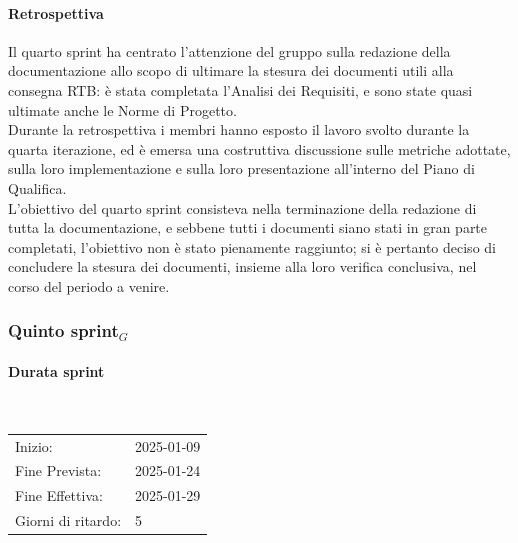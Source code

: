 \documentclass[10pt]{article}
\begin{document}
{{{{{    \paragraph{Retrospettiva}\mbox{}\vspace{0.4em}

    Il quarto sprint ha centrato l'attenzione del gruppo sulla redazione della documentazione allo scopo di ultimare la stesura dei 
    documenti utili alla consegna RTB: è stata completata l'Analisi dei Requisiti, e sono state quasi ultimate anche le Norme di Progetto.\\
    Durante la retrospettiva i membri hanno esposto il lavoro svolto durante la quarta iterazione, ed è emersa una costruttiva discussione
    sulle metriche adottate, sulla loro implementazione e sulla loro presentazione all'interno del Piano di Qualifica.\\
    L'obiettivo del quarto sprint consisteva nella terminazione della redazione di tutta la documentazione, e sebbene tutti i documenti siano
    stati in gran parte completati, l'obiettivo non è stato pienamente raggiunto; si è pertanto deciso di concludere la stesura dei documenti,
    insieme alla loro verifica conclusiva, nel corso del periodo a venire.



\newpage
\subsubsection{Quinto sprint$_G$}
\label{quinto-sprint$_G$}
    
    \paragraph{Durata sprint}\mbox{}\\
    \vspace{-1.5em}
    \begin{table}[h] 
    \renewcommand{\arraystretch}{1.2}  
    \begin{tabular}{ l l }
        Inizio: & 2025-01-09 \\
        Fine Prevista: & 2025-01-24 \\
        Fine Effettiva: & 2025-01-29 \\
        Giorni di ritardo: & 5 \\
    \end{tabular}
    \end{table}
    \vspace{-2em}
    {\renewcommand{\arraystretch}{1.5}%
    
}}}}}}
\end{document}
